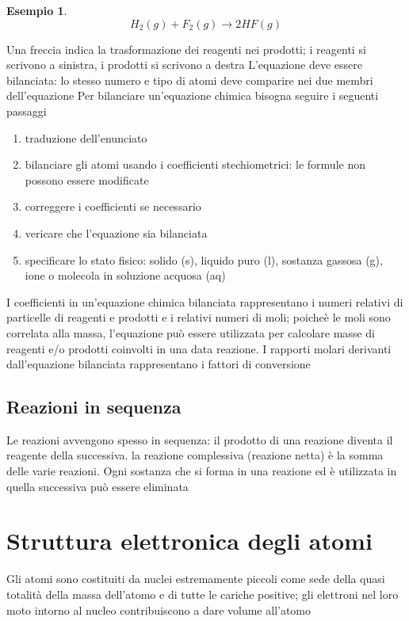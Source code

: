 \documentclass[a4paper,11pt]{report}
\newtheorem*{es}{Esempio}
\begin{document}
\begin{es}
	\begin{equation*}
		H_2(g) + F_2(g) \longrightarrow 2HF(g)
	\end{equation*}
\end{es}

\noindent Una freccia indica la trasformazione dei reagenti nei prodotti; i reagenti si scrivono a sinistra, i prodotti si scrivono a destra \newline
L'equazione deve essere bilanciata: lo stesso numero e tipo di atomi deve comparire nei due membri dell'equazione \newline
Per bilanciare un'equazione chimica bisogna seguire i seguenti passaggi
\begin{enumerate}
	\item traduzione dell'enunciato
	\item bilanciare gli atomi usando i coefficienti stechiometrici: le formule non possono essere modificate
	\item correggere i coefficienti se necessario
	\item vericare che l'equazione sia bilanciata
	\item specificare lo stato fisico: solido (s), liquido puro (l), sostanza gassosa (g), ione o molecola in soluzione acquosa (aq)
\end{enumerate}
I coefficienti in un'equazione chimica bilanciata rappresentano i numeri relativi di particelle di reagenti e prodotti e i relativi numeri di moli; poicheè le moli sono correlata alla massa, l'equazione può essere utilizzata per calcolare masse di reagenti e/o prodotti coinvolti in una data reazione. I rapporti molari derivanti dall'equazione bilanciata rappresentano i fattori di conversione

\section{Reazioni in sequenza}
Le reazioni avvengono spesso in sequenza: il prodotto di una reazione diventa il reagente della successiva. la reazione complessiva (reazione netta) è la somma delle varie reazioni. Ogni sostanza che si forma in una reazione ed è utilizzata in quella successiva può essere eliminata

\chapter{Struttura elettronica degli atomi}

Gli atomi sono costituiti da nuclei estremamente piccoli come sede della quasi totalità della massa dell'atomo e di tutte le cariche positive; gli elettroni nel loro moto intorno al nucleo contribuiscono a dare volume all'atomo
\end{document}
